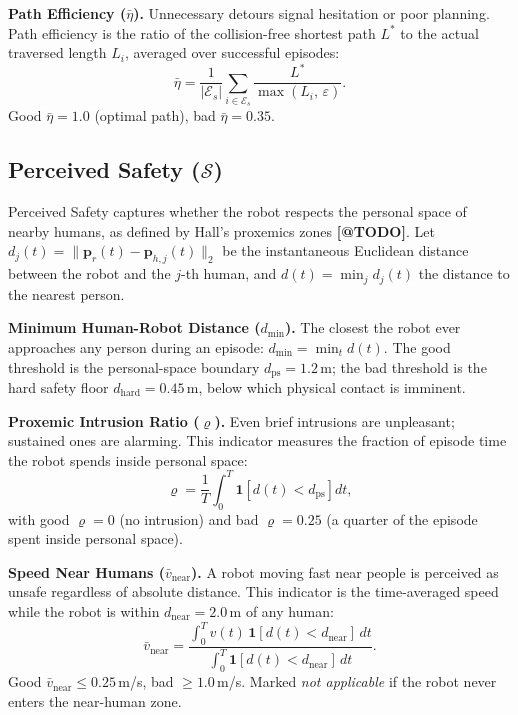 \documentclass[conference]{IEEEtran}
\makeatletter
\newcommand{\tcite}{\textbf{[@TODO]}}
\makeatother
\begin{document}
\textbf{Path Efficiency ($\bar\eta$).}
Unnecessary detours signal hesitation or poor planning. Path efficiency is
the ratio of the collision-free shortest path $L^*$ to the actual traversed
length $L_i$, averaged over successful episodes:
\begin{equation}
  \bar{\eta} = \frac{1}{|\mathcal{E}_s|}
    \sum_{i \in \mathcal{E}_s} \frac{L^*}{\max(L_i,\,\varepsilon)}.
\end{equation}
Good $\bar{\eta} = 1.0$ (optimal path), bad $\bar{\eta} = 0.35$.

\subsection{Perceived Safety ($\mathcal{S}$)}

Perceived Safety captures whether the robot respects the personal space of
nearby humans, as defined by Hall's proxemics zones \tcite.
Let $d_j(t) = \|\mathbf{p}_r(t) - \mathbf{p}_{h,j}(t)\|_2$ be the
instantaneous Euclidean distance between the robot and the $j$-th human,
and $d(t) = \min_j d_j(t)$ the distance to the nearest person.

\textbf{Minimum Human-Robot Distance ($d_{\min}$).}
The closest the robot ever approaches any person during an episode:
$d_{\min} = \min_t d(t)$.
The good threshold is the personal-space boundary $d_\text{ps} = 1.2$\,m;
the bad threshold is the hard safety floor $d_\text{hard} = 0.45$\,m,
below which physical contact is imminent.

\textbf{Proxemic Intrusion Ratio ($\varrho$).}
Even brief intrusions are unpleasant; sustained ones are alarming.
This indicator measures the fraction of episode time the robot spends inside
personal space:
\begin{equation}
  \varrho = \frac{1}{T}\int_0^T
    \mathbf{1}\!\left[d(t) < d_\text{ps}\right] dt,
\end{equation}
with good $\varrho = 0$ (no intrusion) and bad $\varrho = 0.25$ (a quarter
of the episode spent inside personal space).

\textbf{Speed Near Humans ($\bar{v}_\text{near}$).}
A robot moving fast near people is perceived as unsafe regardless of
absolute distance. This indicator is the time-averaged speed while the robot
is within $d_\text{near} = 2.0$\,m of any human:
\begin{equation}
  \bar{v}_\text{near} =
    \frac{\displaystyle\int_0^T v(t)\,\mathbf{1}[d(t) < d_\text{near}]\,dt}
         {\displaystyle\int_0^T \mathbf{1}[d(t) < d_\text{near}]\,dt}.
\end{equation}
Good $\bar{v}_\text{near} \le 0.25$\,m/s, bad $\ge 1.0$\,m/s.
Marked \textit{not applicable} if the robot never enters the near-human zone.
\end{document}
